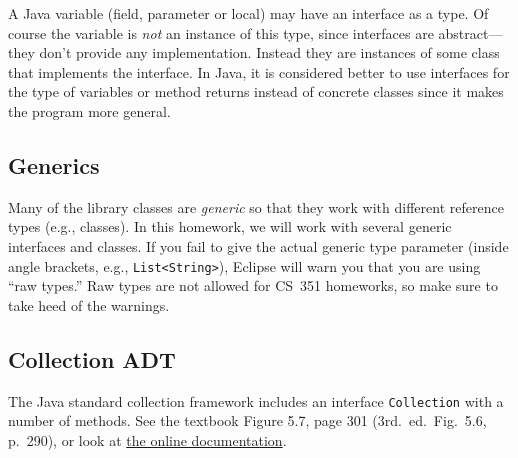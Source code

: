 \documentclass[11pt]{article}
\begin{document}
A Java variable (field, parameter or local) may have an interface as a
type.  Of course the variable is \emph{not} an instance of this type,
since interfaces are abstract---they don't provide any implementation.
Instead they are instances of some class that implements the interface.
In Java, it is considered better to use interfaces for the type of
variables or method returns instead of concrete classes since it makes
the program more general.


\subsection{Generics}

Many of the library classes are \emph{generic} so that they work with
different reference types (e.g., classes).
In this homework, we will work with several generic interfaces and
classes.  If you fail to give the actual generic type parameter
(inside angle brackets, e.g., \verb|List<String>|), Eclipse will
warn you that you are using ``raw types.'' Raw types are not allowed
for CS~351 homeworks, so make sure to take heed of the warnings.

\subsection{Collection ADT}

The Java standard collection framework includes an interface
\texttt{Collection} with a number of methods.  See the textbook
Figure 5.7, page 301 (3rd.\ ed.\ Fig.\ 5.6, p.\ 290), or look at 
\href{https://docs.oracle.com/javase/8/docs/api/java/util/Collection.html}{the online documentation}.
\end{document}
